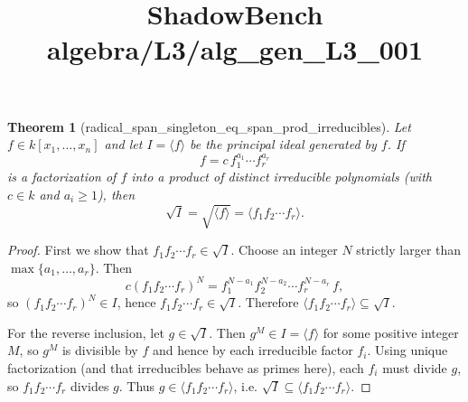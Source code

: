 \documentclass{article}
\title{ShadowBench algebra/L3/alg\_gen\_L3\_001}
\newtheorem{theorem}{Theorem}
\begin{document}
\maketitle

\begin{theorem}[radical_span_singleton_eq_span_prod_irreducibles]\label{prop:radical-principal}
Let $f \in k[x_1,\dots,x_n]$ and let $I=\langle f\rangle$ be the principal ideal generated by $f$.
If
\[
f = c\, f_1^{a_1}\cdots f_r^{a_r}
\]
is a factorization of $f$ into a product of \emph{distinct} irreducible polynomials
(with $c\in k$ and $a_i\ge 1$), then
\[
\sqrt{I}=\sqrt{\langle f\rangle}=\langle f_1 f_2\cdots f_r\rangle.
\]
\end{theorem}

\begin{proof}
First we show that $f_1 f_2\cdots f_r \in \sqrt{I}$.
Choose an integer $N$ strictly larger than $\max\{a_1,\dots,a_r\}$.
Then
\[
c (f_1 f_2\cdots f_r)^N
=
f_1^{N-a_1} f_2^{N-a_2}\cdots f_r^{N-a_r}\, f,
\]
so $(f_1 f_2\cdots f_r)^N \in I$, hence $f_1 f_2\cdots f_r \in \sqrt{I}$.
Therefore $\langle f_1 f_2\cdots f_r\rangle \subseteq \sqrt{I}$.

For the reverse inclusion, let $g\in \sqrt{I}$.
Then $g^M\in I=\langle f\rangle$ for some positive integer $M$,
so $g^M$ is divisible by $f$ and hence by each irreducible factor $f_i$.
Using unique factorization (and that irreducibles behave as primes here),
each $f_i$ must divide $g$, so $f_1 f_2\cdots f_r$ divides $g$.
Thus $g\in \langle f_1 f_2\cdots f_r\rangle$, i.e. $\sqrt{I}\subseteq \langle f_1 f_2\cdots f_r\rangle$.
\end{proof}
\end{document}
